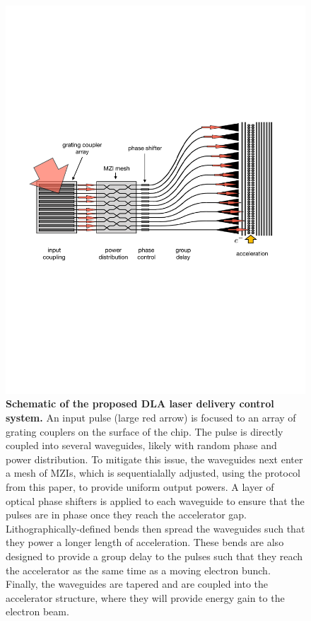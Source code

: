 \documentclass[%
 reprint,
 amsmath,amssymb,
 aps,
prstab,
floatfix,
]{revtex4-1}
\begin{document}
\begin{figure}
\includegraphics[width=\columnwidth]{Fig1.pdf}
\caption{\label{fig:setup} \textbf{Schematic of the proposed DLA laser delivery control system.} An input pulse (large red arrow) is focused to an array of grating couplers on the surface of the chip.  The pulse is directly coupled into several waveguides, likely with random phase and power distribution.  To mitigate this issue, the waveguides next enter a mesh of MZIs, which is sequentialally adjusted, using the protocol from this paper, to provide uniform output powers.  A layer of optical phase shifters is applied to each waveguide to ensure that the pulses are in phase once they reach the accelerator gap.  Lithographically-defined bends then spread the waveguides such that they power a longer length of acceleration.  These bends are also designed to provide a group delay to the pulses such that they reach the accelerator as the same time as a moving electron bunch.  Finally, the waveguides are tapered and are coupled into the accelerator structure, where they will provide energy gain to the electron beam.}
\end{figure}
\end{document}
